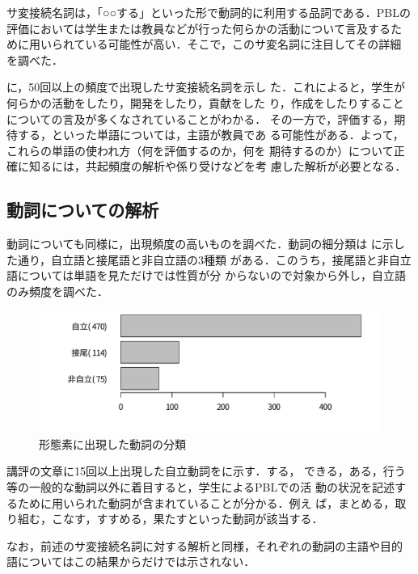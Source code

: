 \documentclass[submit]{ipsj}
\begin{document}
サ変接続名詞は，「○○する」といった形で動詞的に利用する品詞である．PBLの
評価においては学生または教員などが行った何らかの活動について言及するた
めに用いられている可能性が高い．そこで，このサ変名詞に注目してその詳細
を調べた．

に，50回以上の頻度で出現したサ変接続名詞を示し
た．これによると，学生が何らかの活動をしたり，開発をしたり，貢献をした
り，作成をしたりすることについての言及が多くなされていることがわかる．
その一方で，評価する，期待する，といった単語については，主語が教員であ
る可能性がある．よって，これらの単語の使われ方（何を評価するのか，何を
期待するのか）について正確に知るには，共起頻度の解析や係り受けなどを考
慮した解析が必要となる．



\subsection{動詞についての解析}
動詞についても同様に，出現頻度の高いものを調べた．動詞の細分類は
に示した通り，自立語と接尾語と非自立語の3種類
がある．このうち，接尾語と非自立語については単語を見ただけでは性質が分
からないので対象から外し，自立語のみ頻度を調べた．

\begin{figure}[t]
 \includegraphics[width=\columnwidth]{R/figure/doushi.pdf}
 \caption{形態素に出現した動詞の分類}
 \label{fig:動詞の細分類}
\end{figure}

講評の文章に15回以上出現した自立動詞をに示す．する，
できる，ある，行う等の一般的な動詞以外に着目すると，学生によるPBLでの活
動の状況を記述するために用いられた動詞が含まれていることが分かる．例え
ば，まとめる，取り組む，こなす，すすめる，果たすといった動詞が該当する．

なお，前述のサ変接続名詞に対する解析と同様，それぞれの動詞の主語や目的
語についてはこの結果からだけでは示されない．
\end{document}
